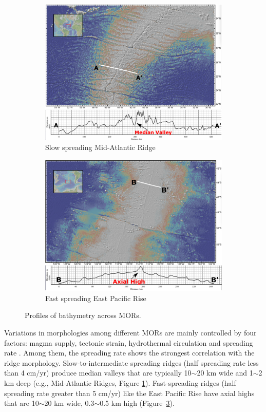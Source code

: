 \begin{figure}[h]
\centering
\begin{subfigure}{.5\textwidth}
  \centering
  \includegraphics[width=.8\linewidth]{./Figures/fig_Intro1_1.png}
  \caption{\small{Slow spreading Mid-Atlantic Ridge}}
  \label{fig_Intro1_1}
\end{subfigure}%
\begin{subfigure}{.5\textwidth}
  \centering
  \includegraphics[width=.8\linewidth]{./Figures/fig_Intro1_3.png}
  \caption{\small{Fast spreading East Pacific Rise}}
  \label{fig_Intro1_3}
\end{subfigure}
\caption{Profiles of bathymetry across MORs.}
\end{figure}

Variations in morphologies among different MORs are mainly controlled by four factors: magma supply, tectonic strain, hydrothermal circulation and spreading rate \citep{Fowler2004}.
Among them, the spreading rate shows the strongest correlation with the ridge morphology. Slow-to-intermediate spreading ridges (half spreading rate less than 4 cm/yr) produce median valleys that are typically 10$\sim$20 km wide and 1$\sim$2 km deep (e.g., Mid-Atlantic Ridges, Figure \ref{fig_Intro1_1}). Fast-spreading ridges (half spreading rate greater than 5 cm/yr) like the East Pacific Rise have axial highs that are 10$\sim$20 km wide, 0.3$\sim$0.5 km high (Figure~\hyperref[fig_Intro1_3]{\ref{fig_Intro1_3}}).

